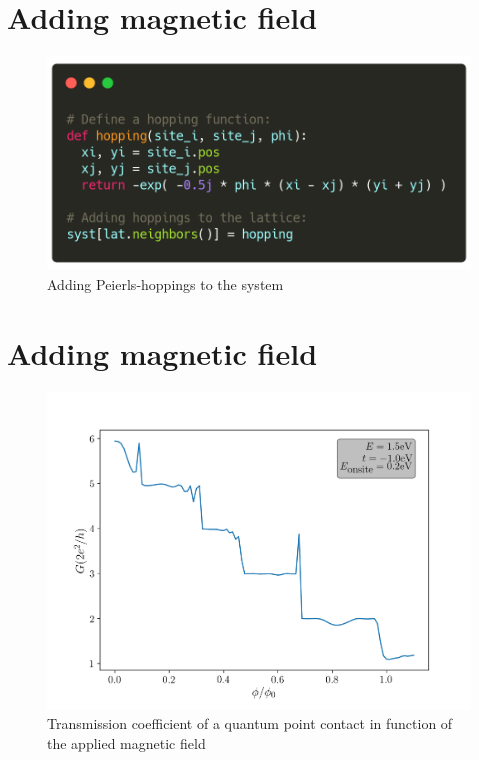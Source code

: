 \documentclass[12pt]{article}
\numberwithin{equation}{section}
\begin{document}
\newpage
\section*{Adding magnetic field}
\begin{figure}[h!]
  \begin{center}
  \includegraphics[height=0.55\textheight]{./media/example-peierls-code.png}
  \caption{Adding Peierls-hoppings to the system}
  \label{fig:peierls}
  \end{center}
\end{figure}

\newpage
\section*{Adding magnetic field}
\begin{figure}[h!]
    \begin{center}
        \includegraphics[height=0.7\textheight]{./media/qpc_L10_W5_VS0_2_cond_phi_e1_5.png}
        \caption{Transmission coefficient of a quantum point contact in function of the applied magnetic field}
        \label{fig:qpc_L10_W5_VS0_2_cond_phi_e1_50.png}
    \end{center}
\end{figure}
\end{document}
